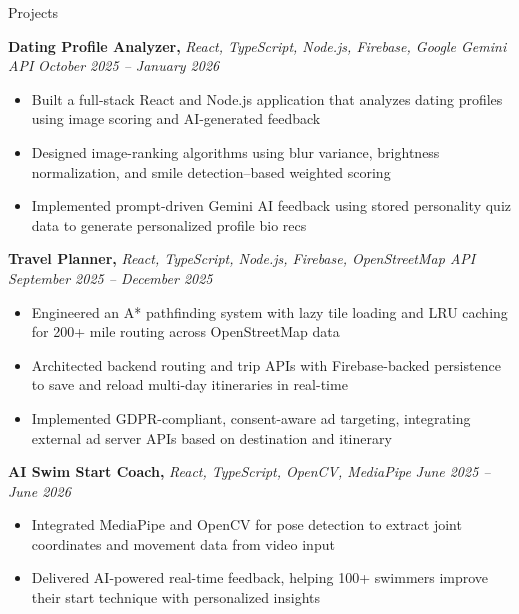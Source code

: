 \documentclass[10pt]{czresume}
\begin{document}
\begin{rSection}{Projects}
\vspace{-1em}

\item \textbf{Dating Profile Analyzer,} {\em React, TypeScript, Node.js, Firebase, Google Gemini API} \hfill {\em October 2025 -- January 2026}
\begin{itemize}
    \item Built a full-stack React and Node.js application that analyzes dating profiles using image scoring and AI-generated feedback
    \item Designed image-ranking algorithms using blur variance, brightness normalization, and smile detection--based weighted scoring
    \item Implemented prompt-driven Gemini AI feedback using stored personality quiz data to generate personalized profile bio recs
\end{itemize}

\item \textbf{Travel Planner,} {\em React, TypeScript, Node.js, Firebase, OpenStreetMap API} \hfill {\em September 2025 -- December 2025}
\begin{itemize}
    \item Engineered an A* pathfinding system with lazy tile loading and LRU caching for 200+ mile routing across OpenStreetMap data
    \item Architected backend routing and trip APIs with Firebase-backed persistence to save and reload multi-day itineraries in real-time
    \item Implemented GDPR-compliant, consent-aware ad targeting, integrating external ad server APIs based on destination and itinerary
\end{itemize}

\item \textbf{AI Swim Start Coach,} {\em React, TypeScript, OpenCV, MediaPipe} \hfill {\em June 2025 -- June 2026}
\begin{itemize}
    \item Integrated MediaPipe and OpenCV for pose detection to extract joint coordinates and movement data from video input
    \item Delivered AI-powered real-time feedback, helping 100+ swimmers improve their start technique with personalized insights
\end{itemize}

\end{rSection}
\end{document}
